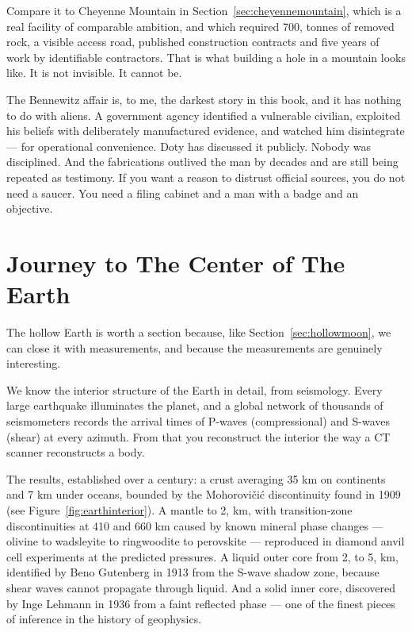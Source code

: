 Compare it to Cheyenne Mountain in Section~\ref{sec:cheyennemountain}, which is a real facility of comparable ambition,
and which required 700, tonnes of removed rock, a visible access road, published construction
contracts and five years of work by identifiable contractors. That is what building a hole in a
mountain looks like. It is not invisible. It cannot be.

\begin{funfact}
The Bennewitz affair is, to me, the darkest story in this book, and it has nothing to do with
aliens. A government agency identified a vulnerable civilian, exploited his beliefs with
deliberately manufactured evidence, and watched him disintegrate --- for operational convenience.
Doty has discussed it publicly. Nobody was disciplined. And the fabrications outlived the man by
decades and are still being repeated as testimony. If you want a reason to distrust official
sources, you do not need a saucer. You need a filing cabinet and a man with a badge and an
objective.
\end{funfact}

\section{Journey to The Center of The Earth}\label{sec:journeycenterearth}

The hollow Earth is worth a section because, like Section~\ref{sec:hollowmoon}, we can close it with measurements,
and because the measurements are genuinely interesting.

We know the interior structure of the Earth in detail, from seismology. Every large earthquake
illuminates the planet, and a global network of thousands of seismometers records the arrival times
of P-waves (compressional) and S-waves (shear) at every azimuth. From that you reconstruct the
interior the way a CT scanner reconstructs a body.

The results, established over a century: a crust averaging 35 km on continents and 7 km under
oceans, bounded by the Mohorovi\v{c}i\'c discontinuity found in 1909 (see Figure~\ref{fig:earthinterior}). A mantle to 2, km, with
transition-zone discontinuities at 410 and 660 km caused by known mineral phase changes ---
olivine to wadsleyite to ringwoodite to perovskite --- reproduced in diamond anvil cell
experiments at the predicted pressures. A liquid outer core from 2, to 5, km, identified
by Beno Gutenberg in 1913 from the S-wave shadow zone, because shear waves cannot propagate through
liquid. And a solid inner core, discovered by Inge Lehmann in 1936 from a faint reflected phase ---
one of the finest pieces of inference in the history of geophysics.

